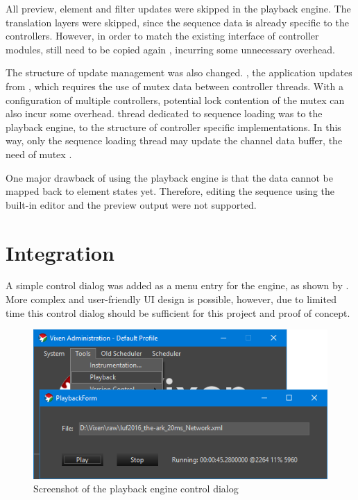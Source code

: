All preview, element and filter updates were skipped in the playback engine. The translation layers were skipped, since the sequence data is already specific to the controllers. However, in order to match the existing interface of controller modules,  still need to be copied again , incurring some unnecessary overhead.

The structure of update management was also changed. , the application updates  from , which requires the use of mutex  data  between controller threads. With a configuration  of multiple controllers, potential lock contention of the mutex can also incur some overhead.  thread dedicated to sequence loading was  to the playback engine,  to the structure of controller specific implementations. In this way, only the sequence loading thread may update the channel data buffer,  the need of mutex .


One major drawback of using the playback engine is that the  data cannot be mapped back to element states yet. Therefore, editing the  sequence using the built-in editor and the preview output were not supported.

\section{Integration}

A simple control dialog was added as a menu entry for the  engine, as shown by . More complex and user-friendly UI design is possible, however, due to limited time  this control dialog should be sufficient for this project and proof of concept.

\begin{figure}[t]
  \centering
  \includegraphics[width=0.8\columnwidth]{Figs/vixen_playback.png}
  \caption{\footnotesize Screenshot of the playback engine control dialog}
  \label{fig:vixen_playback}
\end{figure}

